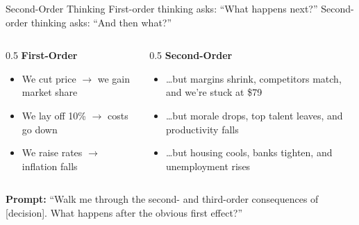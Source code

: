 \documentclass[aspectratio=169]{beamer}
\begin{document}
\begin{frame}{Second-Order Thinking}
First-order thinking asks: ``What happens next?''  \alert{Second-order thinking} asks: ``And then what?''
\vspace{0.3cm}
\begin{columns}[T]
\begin{column}{0.5\textwidth}
\textbf{First-Order}
\begin{itemize}\small
  \item We cut price $\rightarrow$ we gain market share
  \item We lay off 10\% $\rightarrow$ costs go down
  \item We raise rates $\rightarrow$ inflation falls
\end{itemize}
\end{column}
\begin{column}{0.5\textwidth}
\textbf{Second-Order}
\begin{itemize}\small
  \item \ldots but margins shrink, competitors match, and we're stuck at \$79
  \item \ldots but morale drops, top talent leaves, and productivity falls
  \item \ldots but housing cools, banks tighten, and unemployment rises
\end{itemize}
\end{column}
\end{columns}
\vspace{0.3cm}
\textbf{Prompt:} ``Walk me through the second- and third-order consequences of [decision].  What happens after the obvious first effect?''
\end{frame}
\end{document}
